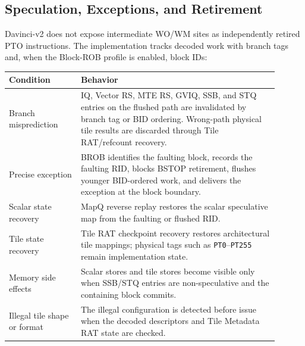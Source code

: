 \subsection{Speculation, Exceptions, and Retirement}
Davinci-v2 does not expose intermediate WO/WM sites as independently retired PTO instructions. The implementation tracks decoded work with branch tags and, when the Block-ROB profile is enabled, block IDs:
\begin{longtable}{@{}L{0.24\linewidth}L{0.66\linewidth}@{}}
\toprule
Condition & Behavior \\
\midrule
Branch misprediction & IQ, Vector RS, MTE RS, GVIQ, SSB, and STQ entries on the flushed path are invalidated by branch tag or BID ordering. Wrong-path physical tile results are discarded through Tile RAT/refcount recovery. \\
Precise exception & BROB identifies the faulting block, records the faulting RID, blocks BSTOP retirement, flushes younger BID-ordered work, and delivers the exception at the block boundary. \\
Scalar state recovery & MapQ reverse replay restores the scalar speculative map from the faulting or flushed RID. \\
Tile state recovery & Tile RAT checkpoint recovery restores architectural tile mappings; physical tags such as \texttt{PT0}--\texttt{PT255} remain implementation state. \\
Memory side effects & Scalar stores and tile stores become visible only when SSB/STQ entries are non-speculative and the containing block commits. \\
Illegal tile shape or format & The illegal configuration is detected before issue when the decoded descriptors and Tile Metadata RAT state are checked. \\
\bottomrule
\end{longtable}


